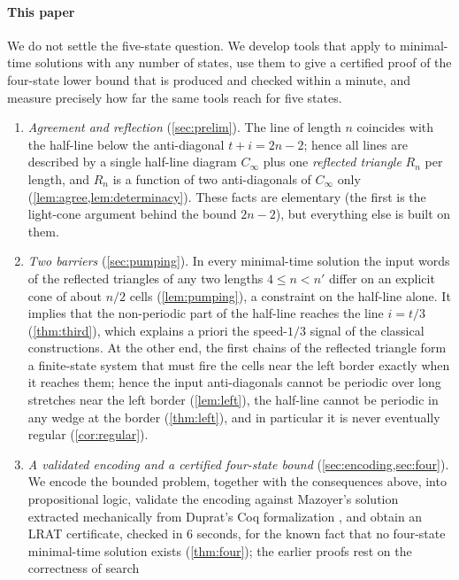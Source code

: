 \paragraph{This paper}
We do not settle the five-state question. We develop tools that apply to
minimal-time solutions with any number of states, use them to give a
certified proof of the four-state lower bound that is produced and checked
within a minute, and measure precisely how far the same tools reach for
five states.
\begin{enumerate}[label=(\roman*)]
\item \emph{Agreement and reflection} (\cref{sec:prelim}). The line of
  length $n$ coincides with the half-line below the anti-diagonal
  $t+i=2n-2$; hence all lines are described by a single half-line diagram
  $C_\infty$ plus one \emph{reflected triangle} $R_n$ per length, and $R_n$ is
  a function of two anti-diagonals of $C_\infty$ only
  (\cref{lem:agree,lem:determinacy}). These facts are elementary (the first
  is the light-cone argument behind the bound $2n-2$), but everything else
  is built on them.
\item \emph{Two barriers} (\cref{sec:pumping}). In every minimal-time
  solution the input words of the reflected triangles of any two lengths
  $4\le n<n'$ differ on an explicit cone of about $n/2$ cells
  (\cref{lem:pumping}), a constraint on the half-line alone. It implies that
  the non-periodic part of the half-line reaches the line $i=t/3$
  (\cref{thm:third}), which explains a priori the speed-$1/3$ signal of the
  classical constructions. At the other end, the first chains of the
  reflected triangle form a finite-state system that must fire the cells near
  the left border exactly when it reaches them; hence the input
  anti-diagonals cannot be periodic over long stretches near the left border
  (\cref{lem:left}), the half-line cannot be periodic in any wedge at the
  border (\cref{thm:left}), and in particular it is never eventually regular
  (\cref{cor:regular}).
\item \emph{A validated encoding and a certified four-state bound}
  (\cref{sec:encoding,sec:four}). We encode the bounded problem, together
  with the consequences above, into propositional logic, validate the
  encoding against Mazoyer's solution extracted mechanically from Duprat's
  Coq formalization \cite{Duprat97}, and obtain an LRAT certificate, checked
  in $6$ seconds, for the known fact that no four-state minimal-time solution
  exists (\cref{thm:four}); the earlier proofs
  \cite{Balzer67,Yunes93,Sanders94} rest on the correctness of search

\end{enumerate}
